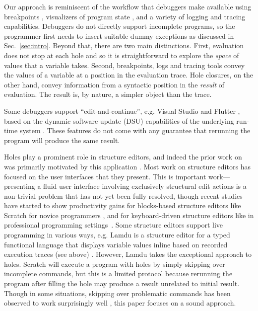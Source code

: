
Our approach is reminiscent of the workflow that debuggers make available using breakpoints \cite{fitzgerald2008debugging,DBLP:journals/jfp/TolmachA95}, visualizers of program state \cite{Nelson2017,Guo13}, and a variety of logging and tracing capabilities.
%
Debuggers do not directly support incomplete programs, so the programmer first needs to insert suitable dummy exceptions as discussed in Sec.~\ref{sec:intro}.
%
Beyond that, there are two main distinctions. First, evaluation does not stop at each hole and so it is straightforward to explore the \emph{space} of values that a variable takes. Second, breakpoints, logs and tracing tools convey the values of a variable at a position in the evaluation trace. Hole closures, on the other hand, convey information from a syntactic position in the \emph{result} of evaluation. The result is, by nature, a simpler object than the trace. %

Some debuggers support ``edit-and-continue'', e.g. Visual Studio \cite{VSEditAndContinue} and Flutter \cite{flutter}, based on the dynamic software update (DSU) capabilities of the underlying run-time system \cite{DBLP:journals/toplas/StoyleHBSN07,DBLP:conf/vstte/HaydenMHFF12,DBLP:journals/toplas/HicksN05}. These features do not come with any guarantee that rerunning the program will produce the same result.



Holes play a prominent role in structure editors, and indeed the prior work on \Hazelnut was primarily motivated by this application \cite{popl-paper}. 
Most work on structure editors has focused on the user interfaces that they
present. This is important work---presenting a fluid user interface involving
exclusively structural edit actions is a non-trivial problem that has not yet
been fully resolved, though recent studies have started to show productivity
gains for blocks-based structure editors like Scratch for novice programmers \cite{Resnick:2009:SP:1592761.1592779,DBLP:conf/chi/WeintropASFLSF18,DBLP:conf/acmidc/WeintropW15}, and for keyboard-driven structure
editors like  in professional programming settings~\cite{DBLP:conf/vl/Asenov014,DBLP:conf/sle/VolterSBK14,voelter_mbeddr:_2012}.
%
Some structure editors support live programming in various ways, e.g. Lamdu is a structure editor for a typed functional language that displays variable values inline based on recorded execution traces (see above) \cite{lamdu}. However, Lamdu takes the exceptional approach to holes. Scratch will execute a program with holes by simply skipping over incomplete commands, but this is a limited protocol because rerunning the program after filling the hole may produce a result unrelated to initial result. Though in some situations, skipping over problematic commands has been observed to work surprisingly well \cite{DBLP:conf/dac/Rinard12}, this paper focuses on a sound approach. 


